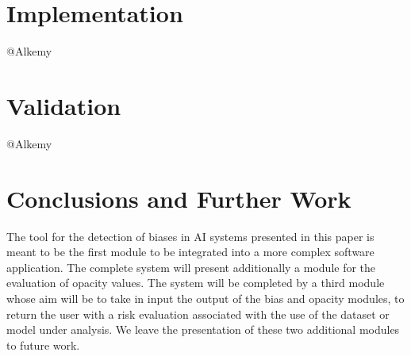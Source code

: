 \documentclass[
]{ceurart}
\begin{document}
\section{Implementation}
\label{sec:implementation}

@Alkemy

\section{Validation}
\label{sec:validation}

@Alkemy


\section{Conclusions and Further Work}
\label{sec:conclusions}

The tool for the detection of biases in AI systems presented in this paper is meant to be the first module to be integrated into a more complex software application. The complete system will present additionally a module for the evaluation of opacity values. The system will be completed by a third module whose aim will be to take in input the output of the bias and opacity modules, to return the user with a risk evaluation associated with the use of the dataset or model under analysis. We leave the presentation of these two additional modules to future work.



%
%
%
\end{document}
